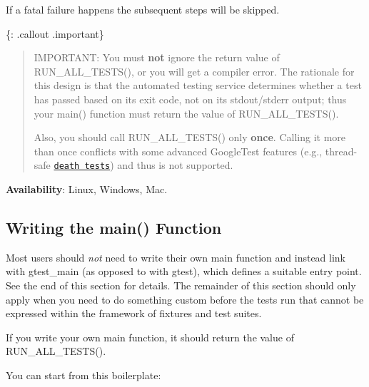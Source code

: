 If a fatal failure happens the subsequent steps will be skipped.

\{\+: .callout .important\} \begin{quote}
I\+M\+P\+O\+R\+T\+A\+NT\+: You must {\bfseries not} ignore the return value of {\ttfamily R\+U\+N\+\_\+\+A\+L\+L\+\_\+\+T\+E\+S\+T\+S()}, or you will get a compiler error. The rationale for this design is that the automated testing service determines whether a test has passed based on its exit code, not on its stdout/stderr output; thus your {\ttfamily main()} function must return the value of {\ttfamily R\+U\+N\+\_\+\+A\+L\+L\+\_\+\+T\+E\+S\+T\+S()}.

Also, you should call {\ttfamily R\+U\+N\+\_\+\+A\+L\+L\+\_\+\+T\+E\+S\+T\+S()} only {\bfseries once}. Calling it more than once conflicts with some advanced Google\+Test features (e.\+g., thread-\/safe \href{advanced.md#death-tests}{\tt death tests}) and thus is not supported. \end{quote}


{\bfseries Availability}\+: Linux, Windows, Mac.

\subsection*{Writing the main() Function}

Most users should {\itshape not} need to write their own {\ttfamily main} function and instead link with {\ttfamily gtest\+\_\+main} (as opposed to with {\ttfamily gtest}), which defines a suitable entry point. See the end of this section for details. The remainder of this section should only apply when you need to do something custom before the tests run that cannot be expressed within the framework of fixtures and test suites.

If you write your own {\ttfamily main} function, it should return the value of {\ttfamily R\+U\+N\+\_\+\+A\+L\+L\+\_\+\+T\+E\+S\+T\+S()}.

You can start from this boilerplate\+:


